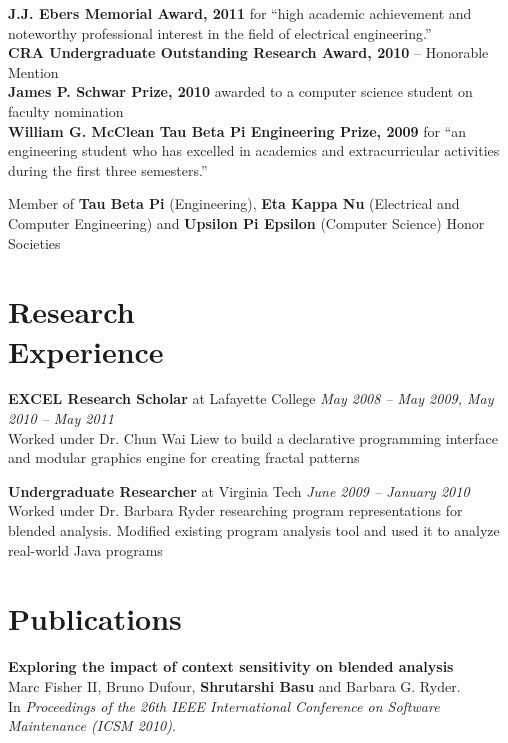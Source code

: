 \documentclass[margin,line]{resume}
\begin{document}
\begin{resume}
    {\bf J.J. Ebers Memorial Award, 2011} for ``high academic achievement and
    noteworthy professional interest in the field of electrical engineering.''\\
    {\bf CRA Undergraduate Outstanding Research Award, 2010} -- Honorable
    Mention \\
    {\bf James P. Schwar Prize, 2010} awarded to a computer science student on
    faculty nomination \\
    {\bf William G. McClean Tau Beta Pi Engineering Prize, 2009} for ``an
    engineering student who has excelled in academics and extracurricular
    activities during the first three semesters.''

    Member of {\bf Tau Beta Pi} (Engineering), {\bf Eta Kappa Nu} (Electrical
    and Computer Engineering) and {\bf Upsilon Pi Epsilon} (Computer Science)
    Honor Societies

    \section{Research\\Experience}

    {\bf EXCEL Research Scholar} at Lafayette College \hfill
    {\it May 2008 -- May 2009, May 2010 -- May 2011}\\
    Worked under Dr. Chun Wai Liew to build a declarative programming interface
    and modular graphics engine for creating fractal patterns

    {\bf Undergraduate Researcher} at Virginia Tech \hfill
    {\it June 2009 -- January 2010}\\
    Worked under Dr. Barbara Ryder researching program representations for
    blended analysis. Modified existing program analysis tool and used it to
    analyze real-world Java programs


    \section{Publications}
    {\bf Exploring the impact of context sensitivity on blended analysis} \\
    Marc Fisher II, Bruno Dufour, {\bf Shrutarshi Basu} and Barbara G. Ryder.\\
    In \emph{Proceedings of the 26th IEEE International Conference on Software Maintenance (ICSM 2010)}.


\end{resume}
\end{document}
